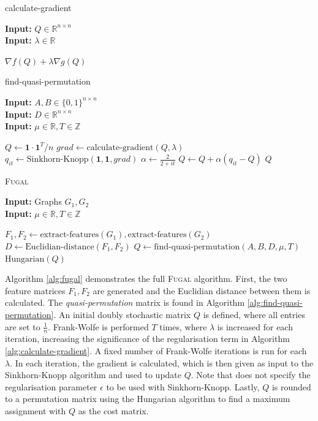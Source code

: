 \begin{algorithm}[H]
\caption{calculate-gradient}\label{alg:calculate-gradient}
\textbf{Input:} $Q \in \mathds{R}^{n \times n}$\\
\textbf{Input:} $\lambda \in \mathds{R}$
\begin{algorithmic}[1]
\State \Return $\nabla f(Q) + \lambda \nabla g(Q)$
\end{algorithmic}
\end{algorithm}

\begin{algorithm}[H]
\caption{find-quasi-permutation}\label{alg:find-quasi-permutation}
\textbf{Input:} $A, B \in \{ 0, 1 \}^{n \times n}$ \\
\textbf{Input:} $D \in \mathds{R}^{n \times n}$ \\
\textbf{Input:} $\mu \in \mathds{R}, T \in \mathds{Z}$
\begin{algorithmic}[1]
\State $Q \gets \boldsymbol{1} \cdot \boldsymbol{1}^T / n$
     
        \State $grad \gets \text{calculate-gradient}(Q, \lambda)$
        \State $q_{it} \gets \text{Sinkhorn-Knopp}(\boldsymbol{1}, \boldsymbol{1}, grad)$
        \State $\alpha \gets \frac{2}{2 + it}$
        \State $Q \gets Q + \alpha(q_{it} - Q)$
    \EndFor
\EndFor
\State \Return $Q$
\end{algorithmic}
\end{algorithm}

\begin{algorithm}[H]
\caption{\textsc{Fugal}}\label{alg:fugal}
\textbf{Input:} Graphs $G_1, G_2$\\
\textbf{Input:} $\mu \in \mathds{R}, T \in \mathds{Z}$
\begin{algorithmic}[1]
\State $F_1, F_2 \gets \text{extract-features}(G_1), \text{extract-features}(G_2)$
\State $D \gets \text{Euclidian-distance}(F_1, F_2)$
\State $Q \gets \text{find-quasi-permutation}(A, B, D, \mu, T)$
\State \Return $\text{Hungarian}(Q)$
\end{algorithmic}
\end{algorithm}

Algorithm \ref{alg:fugal} demonstrates the full \textsc{Fugal} algorithm. First, the two feature matrices $F_1, F_2$ are generated and the Euclidian distance between them is calculated. The \textit{quasi-permutation} matrix is found in Algorithm \ref{alg:find-quasi-permutation}. An initial doubly stochastic matrix $Q$ is defined, where all entries are set to $\frac{1}{n}$. Frank-Wolfe is performed $T$ times, where $\lambda$ is increased for each iteration, increasing the significance of the regularisation term in Algorithm \ref{alg:calculate-gradient}. A fixed number of Frank-Wolfe iterations is run for each $\lambda$. In each iteration, the gradient is calculated, which is then given as input to the Sinkhorn-Knopp algorithm and used to update $Q$. Note that \cite{fugal2024} does not specify the regularisation parameter $\epsilon$ to be used with Sinkhorn-Knopp. Lastly, $Q$ is rounded to a permutation matrix using the Hungarian algorithm to find a maximum assignment with $Q$ as the cost matrix.

